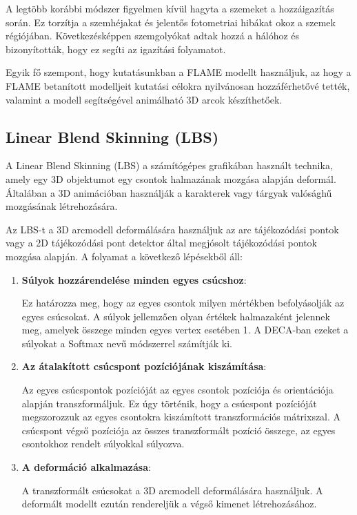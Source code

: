 \documentclass[12pt,a4]{article}
\begin{document}
    A legtöbb korábbi módszer figyelmen kívül hagyta a szemeket a
    hozzáigazítás során. Ez torzítja a szemhéjakat és jelentős fotometriai hibákat okoz a szemek régiójában. Következésképpen szemgolyókat adtak hozzá a hálóhoz és bizonyították, hogy ez segíti az igazítási folyamatot.

    Egyik fő szempont, hogy kutatásunkban a FLAME modellt használjuk, az hogy a FLAME betanított modelljeit kutatási célokra nyilvánosan hozzáférhetővé tették, valamint a modell segítségével animálható 3D arcok készíthetőek.

    \subsection{Linear Blend Skinning (LBS)}
    A Linear Blend Skinning (LBS) a számítógépes grafikában használt technika, amely egy 3D objektumot egy csontok halmazának mozgása alapján deformál. 
Általában a 3D animációban használják a karakterek vagy tárgyak valósághű mozgásának létrehozására.

Az LBS-t a 3D arcmodell deformálására használjuk az arc tájékozódási pontok vagy a 2D tájékozódási pont detektor által megjósolt tájékozódási pontok mozgása alapján.
 A folyamat a következő lépésekből áll:

\begin{enumerate}
    \item \textbf{Súlyok hozzárendelése minden egyes csúcshoz}: 
    
    Ez határozza meg, hogy az egyes csontok milyen mértékben befolyásolják az egyes csúcsokat. 
	A súlyok jellemzően olyan értékek halmazaként jelennek meg, amelyek összege minden egyes vertex esetében 1. A DECA-ban ezeket a súlyokat a Softmax nevű módszerrel számítják ki.

    \item \textbf{Az átalakított csúcspont pozíciójának kiszámítása}: 
    
    Az egyes csúcspontok pozícióját az egyes csontok pozíciója és orientációja alapján transzformáljuk. 
	Ez úgy történik, hogy a csúcspont pozícióját megszorozzuk az egyes csontokra kiszámított transzformációs mátrixszal. 
	A csúcspont végső pozíciója az összes transzformált pozíció összege, az egyes csontokhoz rendelt súlyokkal súlyozva.

    \item \textbf{A deformáció alkalmazása}: 
    
    A transzformált csúcsokat a 3D arcmodell deformálására használjuk. A deformált modellt ezután rendereljük a végső kimenet létrehozásához.
\end{enumerate}
\end{document}
